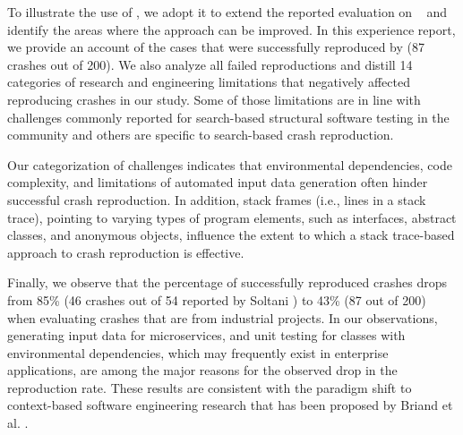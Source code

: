 To illustrate the use of \crashpack, we adopt it to extend the reported evaluation on \evocrash~\cite{soltani2017} and identify the areas where the approach can be improved.
In this experience report, we provide an account of the cases that were successfully reproduced by \evocrash (87 crashes out of 200). 
We also analyze all failed reproductions and distill 14 categories of research and engineering limitations that negatively affected reproducing crashes in our study. 
Some of those limitations are in line with challenges commonly reported for search-based structural software testing in the community \cite{xiao2011precise, McMinn2011, Fraser2014b} and others are specific to search-based crash reproduction.

Our categorization of challenges indicates that environmental dependencies, code complexity, and limitations of automated input data generation often hinder successful crash reproduction.
In addition, stack frames (i.e., lines in a stack trace), pointing to varying types of program elements, such as interfaces, abstract classes, and anonymous objects, influence the extent to which a stack trace-based approach to crash reproduction is effective.

Finally, we observe that the percentage of successfully reproduced crashes drops from 85\% (46 crashes out of 54 reported by Soltani \etal \cite{Soltani2018a}) to 43\% (87 out of 200) when evaluating crashes that are from industrial projects. 
In our observations, generating input data for microservices, and unit testing for classes with environmental dependencies, which may frequently exist in enterprise applications, are among the major reasons for the observed drop in the reproduction rate.
These results are consistent with the paradigm shift to context-based software engineering research that has been proposed by Briand et al. \cite{Briand2017a}.

